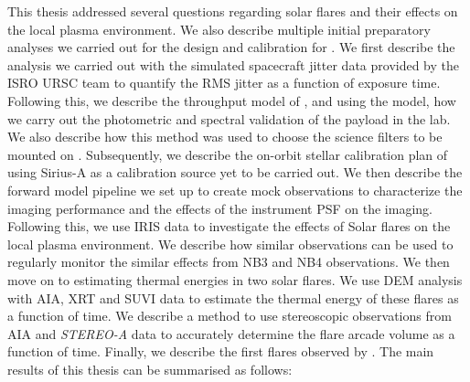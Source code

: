 \justifying 

This thesis addressed several questions regarding solar flares and their effects on the local plasma environment. We also describe multiple initial preparatory analyses we carried out for the design and calibration for {\suit}. We first describe the analysis we carried out with the simulated spacecraft jitter data provided by the ISRO URSC team to quantify the RMS jitter as a function of exposure time. Following this, we describe the throughput model of {\suit}, and using the model, how we carry out the photometric and spectral validation of the payload in the lab. We also describe how this method was used to choose the science filters to be mounted on {\suit}. Subsequently, we describe the on-orbit stellar calibration plan of {\suit} using Sirius-A as a calibration source yet to be carried out. We then describe the forward model pipeline we set up to create mock {\suit} observations to characterize the imaging performance and the effects of the instrument PSF on the imaging. Following this, we use IRIS  data to investigate the effects of Solar flares on the local plasma environment. We describe how similar observations can be used to regularly monitor the similar effects from {\suit} NB3 and NB4 observations. We then move on to estimating thermal energies in two solar flares. We use DEM analysis with AIA, XRT and SUVI data to estimate the thermal energy of these flares as a function of time. We describe a method to use stereoscopic observations from AIA and {\it STEREO-A} data to accurately determine the flare arcade volume as a function of time. Finally, we describe the first flares observed by {\suit}. The main results of this thesis can be summarised as follows:

